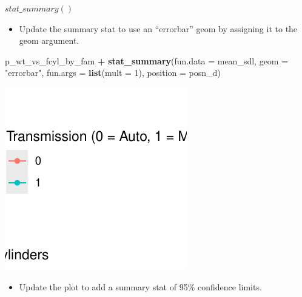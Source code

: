 \documentclass[
  ignorenonframetext,
]{beamer}
\newenvironment{Shaded}{\begin{snugshade}}{\end{snugshade}}
\newcommand{\AttributeTok}[1]{\textcolor[rgb]{0.13,0.29,0.53}{#1}}
\newcommand{\DecValTok}[1]{\textcolor[rgb]{0.00,0.00,0.81}{#1}}
\newcommand{\FunctionTok}[1]{\textcolor[rgb]{0.13,0.29,0.53}{\textbf{#1}}}
\newcommand{\NormalTok}[1]{#1}
\newcommand{\SpecialCharTok}[1]{\textcolor[rgb]{0.81,0.36,0.00}{\textbf{#1}}}
\newcommand{\StringTok}[1]{\textcolor[rgb]{0.31,0.60,0.02}{#1}}
\providecommand{\tightlist}{%
  \setlength{\itemsep}{0pt}\setlength{\parskip}{0pt}}
\begin{document}
\begin{frame}[fragile]{\(stat\_summary()\)}
\label{stat_summary-5}
\begin{itemize}
\tightlist
\item
  Update the summary stat to use an ``errorbar'' geom by assigning it to
  the geom argument.
\end{itemize}


\begin{Shaded}
\begin{Highlighting}[]
\NormalTok{p\_wt\_vs\_fcyl\_by\_fam }\SpecialCharTok{+} \FunctionTok{stat\_summary}\NormalTok{(}\AttributeTok{fun.data =}\NormalTok{ mean\_sdl, }\AttributeTok{geom =} \StringTok{"errorbar"}\NormalTok{,}
    \AttributeTok{fun.args =} \FunctionTok{list}\NormalTok{(}\AttributeTok{mult =} \DecValTok{1}\NormalTok{), }\AttributeTok{position =}\NormalTok{ posn\_d)}
\end{Highlighting}
\end{Shaded}

\begin{center}\includegraphics[width=0.5\linewidth]{Figs/unnamed-chunk-35-1} \end{center}

\begin{itemize}
\tightlist
\item
  Update the plot to add a summary stat of 95\% confidence limits.
\end{itemize}
\end{frame}
\end{document}
